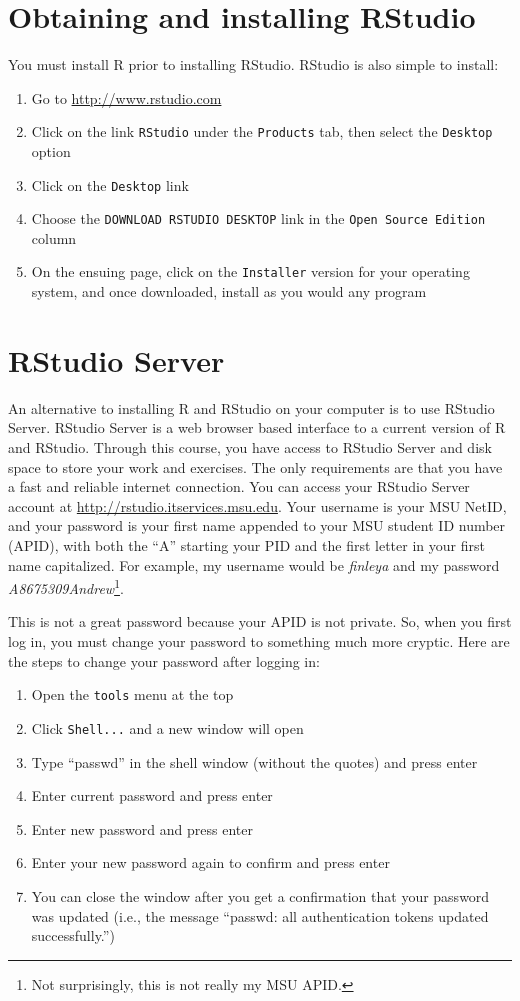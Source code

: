 \section{Obtaining and installing RStudio}

You must install R prior to installing RStudio. RStudio is also simple to install:
\begin{enumerate}
\item Go to \url{http://www.rstudio.com}
\item Click on the link \texttt{RStudio} under the \texttt{Products} tab, then select the \texttt{Desktop} option
\item Click on the \texttt{Desktop} link
\item Choose the \texttt{DOWNLOAD RSTUDIO DESKTOP} link in the \texttt{Open Source Edition} column
\item On the ensuing page, click on the \texttt{Installer} version for your operating system, and once downloaded, install as you would any program
\end{enumerate}

\section{RStudio Server}
An alternative to installing R and RStudio on your computer is to use RStudio Server. RStudio Server is a web browser based interface to a current version of R and RStudio. Through this course, you have access to RStudio Server and disk space to store your work and exercises. The only requirements are that you have a fast and reliable internet connection. You can access your RStudio Server account at \url{http://rstudio.itservices.msu.edu}. Your username is your MSU NetID, and your password is your first name appended to your MSU student ID number (APID), with both the ``A'' starting your PID and the first letter in your first name capitalized. For example, my username would be \emph{finleya} and my password \emph{A8675309Andrew}\footnote{Not surprisingly, this is not really my MSU APID.}.

This is not a great password because your APID is not private. So, when you first log in, you must change your password to something much more cryptic. Here are the steps to change your password after logging in:
\begin{enumerate}
\item Open the \texttt{tools} menu at the top
\item Click \texttt{Shell...} and a new window will open
\item Type ``passwd'' in the shell window (without the quotes) and press enter
\item Enter current password and press enter
\item Enter new password and press enter
\item Enter your new password again to confirm and press enter
\item You can close the window after you get a confirmation that your password was updated (i.e., the message ``passwd: all authentication tokens updated successfully.'')
\end{enumerate}
    
